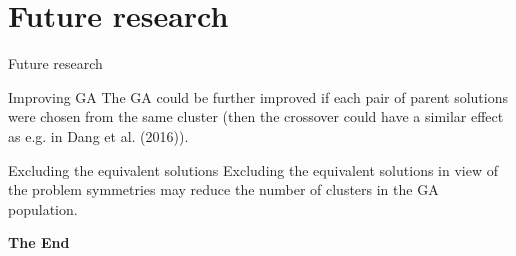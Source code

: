 \documentclass[aspectratio=169,xcolor=dvipsnames]{beamer}
\begin{document}
\section{Future research}

\begin{frame}{Future research}
        \begin{block}{Improving GA}
The GA could be further improved if each pair of parent solutions were chosen from the same cluster (then the crossover could have a similar effect as e.g. in Dang et al. (2016)).
    \end{block}
    \vspace{1cm}	
            \begin{block}{Excluding the equivalent solutions}
Excluding the equivalent solutions in view of the problem symmetries may 
reduce the number of clusters in the GA population.    
    \end{block}
 \end{frame}


\begin{frame}
    \Huge{\centerline{\textbf{The End}}}
\end{frame}

\end{document}
